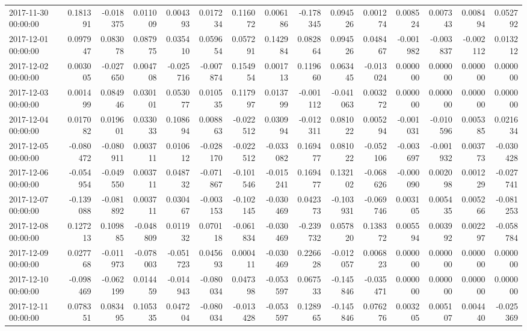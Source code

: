 \begin{tabular}{lrrrrrrrrrrrrrr}
2017-11-30 00:00:00 & 0.181391 & -0.018375 & 0.011009 & 0.004393 & 0.017234 & 0.116072 & 0.006186 & -0.178345 & 0.094526 & 0.001274 & 0.008524 & 0.007343 & 0.008494 & 0.052792 \\
2017-12-01 00:00:00 & 0.097947 & 0.083078 & 0.087975 & 0.035410 & 0.059654 & 0.057291 & 0.142984 & 0.082864 & 0.094526 & 0.048467 & -0.001982 & -0.003837 & -0.002112 & 0.013212 \\
2017-12-02 00:00:00 & 0.003005 & -0.027650 & 0.004708 & -0.025716 & -0.007874 & 0.154954 & 0.001713 & 0.119660 & 0.063445 & -0.013024 & 0.000000 & 0.000000 & 0.000000 & 0.000000 \\
2017-12-03 00:00:00 & 0.001499 & 0.084946 & 0.030101 & 0.053077 & 0.010535 & 0.117997 & 0.013799 & -0.001112 & -0.041063 & 0.003272 & 0.000000 & 0.000000 & 0.000000 & 0.000000 \\
2017-12-04 00:00:00 & 0.017082 & 0.019601 & 0.033033 & 0.108694 & 0.008863 & -0.022512 & 0.030994 & -0.012311 & 0.081022 & 0.005294 & -0.001031 & -0.010596 & 0.005385 & 0.021634 \\
2017-12-05 00:00:00 & -0.080472 & -0.080911 & 0.003711 & 0.010612 & -0.028170 & -0.022512 & -0.033082 & 0.169477 & 0.081022 & -0.052106 & -0.003697 & -0.001932 & 0.003773 & -0.030428 \\
2017-12-06 00:00:00 & -0.054954 & -0.049550 & 0.003711 & 0.048732 & -0.071867 & -0.101546 & -0.015241 & 0.169477 & 0.132102 & -0.068626 & -0.000090 & 0.002098 & 0.001229 & -0.027741 \\
2017-12-07 00:00:00 & -0.139088 & -0.081892 & 0.003711 & 0.030467 & -0.003153 & -0.102145 & -0.030469 & 0.042373 & -0.103931 & -0.069746 & 0.003105 & 0.005435 & 0.005266 & -0.081253 \\
2017-12-08 00:00:00 & 0.127213 & 0.109885 & -0.048809 & 0.011932 & 0.070118 & -0.061834 & -0.030469 & -0.239732 & 0.057820 & 0.138372 & 0.005594 & 0.003992 & 0.002297 & -0.058784 \\
2017-12-09 00:00:00 & 0.027768 & -0.011973 & -0.078003 & -0.051723 & 0.045693 & 0.000411 & -0.030469 & 0.226628 & -0.012057 & 0.006823 & 0.000000 & 0.000000 & 0.000000 & 0.000000 \\
2017-12-10 00:00:00 & -0.098469 & -0.062199 & 0.014459 & -0.014943 & -0.080034 & 0.047398 & -0.053597 & 0.067533 & -0.145846 & -0.035471 & 0.000000 & 0.000000 & 0.000000 & 0.000000 \\
2017-12-11 00:00:00 & 0.078351 & 0.083495 & 0.105335 & 0.047204 & -0.080034 & -0.013428 & -0.053597 & 0.128965 & -0.145846 & 0.076276 & 0.003205 & 0.005107 & 0.004440 & -0.025369 \\

\end{tabular}
